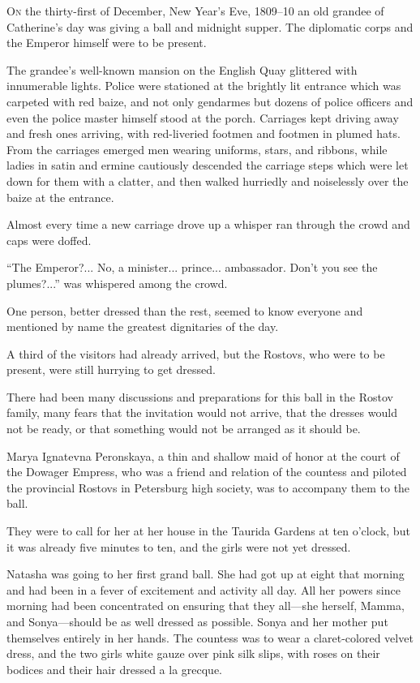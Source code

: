 \lettrine[lines=2, loversize=0.3, lraise=0]{\initfamily O}{n}
the thirty-first of December, New Year's Eve, 1809--10 an old
grandee of Catherine's day was giving a ball and midnight
supper. The diplomatic corps and the Emperor himself were to be
present.

The grandee's well-known mansion on the English Quay glittered
with innumerable lights. Police were stationed at the brightly
lit entrance which was carpeted with red baize, and not only
gendarmes but dozens of police officers and even the police
master himself stood at the porch.  Carriages kept driving away
and fresh ones arriving, with red-liveried footmen and footmen in
plumed hats. From the carriages emerged men wearing uniforms,
stars, and ribbons, while ladies in satin and ermine cautiously
descended the carriage steps which were let down for them with a
clatter, and then walked hurriedly and noiselessly over the baize
at the entrance.

Almost every time a new carriage drove up a whisper ran through
the crowd and caps were doffed.

``The Emperor?... No, a minister... prince... ambassador. Don't
you see the plumes?...'' was whispered among the crowd.

One person, better dressed than the rest, seemed to know everyone
and mentioned by name the greatest dignitaries of the day.

A third of the visitors had already arrived, but the Rostovs, who
were to be present, were still hurrying to get dressed.

There had been many discussions and preparations for this ball in
the Rostov family, many fears that the invitation would not
arrive, that the dresses would not be ready, or that something
would not be arranged as it should be.

Marya Ignatevna Peronskaya, a thin and shallow maid of honor at
the court of the Dowager Empress, who was a friend and relation
of the countess and piloted the provincial Rostovs in Petersburg
high society, was to accompany them to the ball.

They were to call for her at her house in the Taurida Gardens at
ten o'clock, but it was already five minutes to ten, and the
girls were not yet dressed.

Natasha was going to her first grand ball. She had got up at
eight that morning and had been in a fever of excitement and
activity all day. All her powers since morning had been
concentrated on ensuring that they all---she herself, Mamma, and
Sonya---should be as well dressed as possible. Sonya and her
mother put themselves entirely in her hands. The countess was to
wear a claret-colored velvet dress, and the two girls white gauze
over pink silk slips, with roses on their bodices and their hair
dressed a la grecque.

